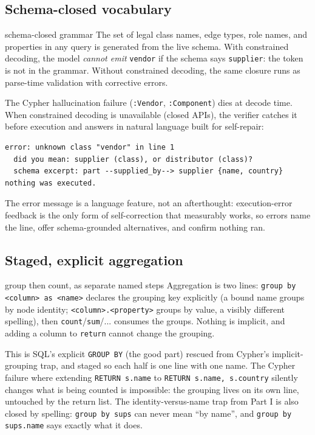 \documentclass[11pt]{article}
\begin{document}
\subsection{Schema-closed vocabulary}

\begin{featurebox}{schema-closed grammar}
The set of legal class names, edge types, role names, and properties in any query is generated from the live schema. With constrained decoding, the model \emph{cannot emit} \texttt{vendor} if the schema says \texttt{supplier}: the token is not in the grammar. Without constrained decoding, the same closure runs as parse-time validation with corrective errors.
\end{featurebox}

The Cypher hallucination failure (\texttt{:Vendor}, \texttt{:Component}) dies at decode time. When constrained decoding is unavailable (closed APIs), the verifier catches it before execution and answers in natural language built for self-repair:

\begin{lstlisting}[style=result]
error: unknown class "vendor" in line 1
  did you mean: supplier (class), or distributor (class)?
  schema excerpt: part --supplied_by--> supplier {name, country}
nothing was executed.
\end{lstlisting}

The error message is a language feature, not an afterthought: execution-error feedback is the only form of self-correction that measurably works, so errors name the line, offer schema-grounded alternatives, and confirm nothing ran.

\subsection{Staged, explicit aggregation}

\begin{featurebox}{group then count, as separate named steps}
Aggregation is two lines: \texttt{group by <column> as <name>} declares the grouping key explicitly (a bound name groups by node identity; \texttt{<column>.<property>} groups by value, a visibly different spelling), then \texttt{count}/\texttt{sum}/... consumes the groups. Nothing is implicit, and adding a column to \texttt{return} cannot change the grouping.
\end{featurebox}

This is SQL's explicit \texttt{GROUP BY} (the good part) rescued from Cypher's implicit-grouping trap, and staged so each half is one line with one name. The Cypher failure where extending \texttt{RETURN s.name} to \texttt{RETURN s.name, s.country} silently changes what is being counted is impossible: the grouping lives on its own line, untouched by the return list. The identity-versus-name trap from Part I is also closed by spelling: \texttt{group by sups} can never mean ``by name'', and \texttt{group by sups.name} says exactly what it does.
\end{document}
